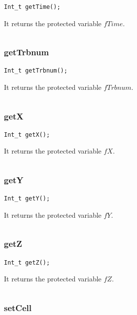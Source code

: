 \documentclass[a4paper]{book}
\begin{document}
\begin{lstlisting}
Int_t getTime();
\end{lstlisting}

It returns the protected variable $fTime$.

\[\]

\subsubsection{getTrbnum}

\begin{lstlisting}
Int_t getTrbnum();
\end{lstlisting}

It returns the protected variable $fTrbnum$.

\[\]

\subsubsection{getX}

\begin{lstlisting}
Int_t getX();
\end{lstlisting}

It returns the protected variable $fX$.

\[\]

\subsubsection{getY}

\begin{lstlisting}
Int_t getY();
\end{lstlisting}

It returns the protected variable $fY$.

\[\]

\subsubsection{getZ}

\begin{lstlisting}
Int_t getZ();
\end{lstlisting}

It returns the protected variable $fZ$.

\[\]

\subsubsection{setCell}
\end{document}
